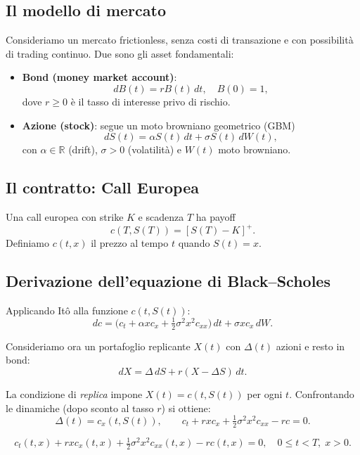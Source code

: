 \documentclass[12pt,a4paper]{book}
\theoremstyle{remark}
\begin{document}
\subsection{Il modello di mercato}
Consideriamo un mercato frictionless, senza costi di transazione e con possibilità di trading continuo.
Due sono gli asset fondamentali:
\begin{itemize}
  \item \textbf{Bond (money market account)}: 
  \[
  dB(t) = r B(t)\,dt, \quad B(0)=1,
  \]
  dove $r \geq 0$ è il tasso di interesse privo di rischio.
  \item \textbf{Azione (stock)}: segue un moto browniano geometrico (GBM)
  \[
  dS(t) = \alpha S(t)\,dt + \sigma S(t)\,dW(t),
  \]
  con $\alpha \in \mathbb R$ (drift), $\sigma > 0$ (volatilità) e $W(t)$ moto browniano.
\end{itemize}

\subsection{Il contratto: Call Europea}
Una call europea con strike $K$ e scadenza $T$ ha payoff
\[
c(T,S(T)) = [S(T) - K]^+.
\]
Definiamo $c(t,x)$ il prezzo al tempo $t$ quando $S(t)=x$.

\subsection{Derivazione dell'equazione di Black--Scholes}
Applicando It\^o alla funzione $c(t,S(t))$:
\[
dc = \big(c_t + \alpha x c_x + \tfrac12 \sigma^2 x^2 c_{xx}\big)\,dt + \sigma x c_x\, dW.
\]

Consideriamo ora un portafoglio replicante $X(t)$ con $\Delta(t)$ azioni e resto in bond:
\[
dX = \Delta\,dS + r(X-\Delta S)\,dt.
\]

La condizione di \emph{replica} impone $X(t)=c(t,S(t))$ per ogni $t$.  
Confrontando le dinamiche (dopo sconto al tasso $r$) si ottiene:
\[
\Delta(t) = c_x(t,S(t)), \quad\quad
c_t + r x c_x + \tfrac12 \sigma^2 x^2 c_{xx} - r c = 0.
\]

\begin{equation}
\label{eq:BS}
\boxed{ \; c_t(t,x) + r x c_x(t,x) + \tfrac12 \sigma^2 x^2 c_{xx}(t,x) - r c(t,x) = 0, \quad 0 \leq t < T, \; x > 0. \;}
\end{equation}
\end{document}
